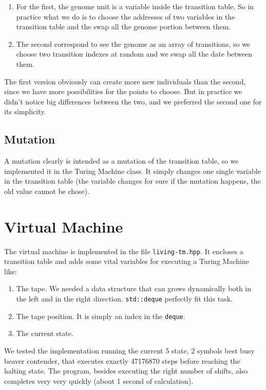 \documentclass{report}
\begin{document}
\begin{enumerate}
\item For the first, the genome unit is a variable inside the transition table. So in practice what we do is to choose the addresses of two variables in the transition table and the swap all the genome portion between them.
\item The second correspond to see the genome as an array of transitions, so we choose two transition indexes at random and we swap all the date between them.
\end{enumerate}

The first version obviously can create more new individuals than the second, since we have more possibilities for the points to choose. But in practice we didn't notice big differences between the two, and we preferred the second one for its simplicity.

\subsection{Mutation}
\label{sec:mutation}
A mutation clearly is intended as a mutation of the transition table, so we implemented it in the Turing Machine class. It simply changes one single variable in the transition table (the variable changes for sure if the mutation happens, the old value cannot be chose).



\section{Virtual Machine}
The virtual machine is implemented in the file \texttt{living-tm.hpp}. It encloses a transition table and adds some vital variables for executing a Turing Machine like:

\begin{enumerate}
\item The tape. We needed a data structure that can grows dynamically both in the left and in the right direction. \texttt{std::deque} perfectly fit this task.
\item The tape position. It is simply an index in the \texttt{deque}.
\item The current state.
\end{enumerate}

We tested the implementation running the current 5 state, 2 symbols best busy beaver contender, that executes exactly 47176870 steps before reaching the halting state. The program, besides executing the right number of shifts, also completes very very quickly (about 1 second of calculation).
\end{document}
